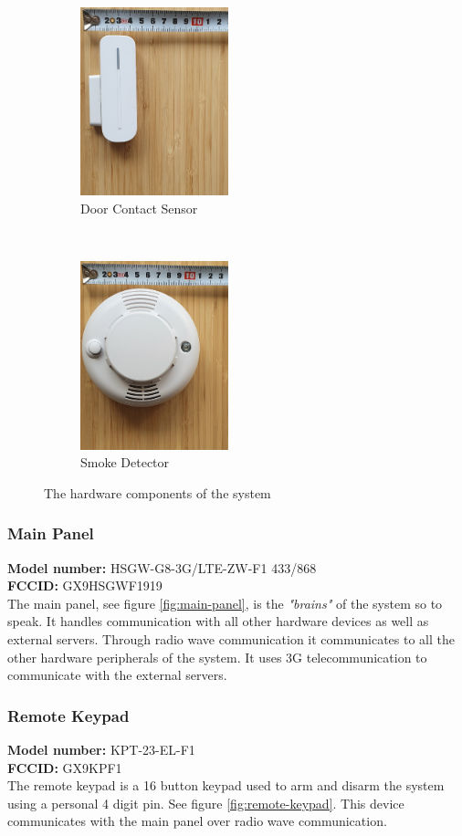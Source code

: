 \begin{figure}[!ht]
    \begin{subfigure}[t]{0.33\textwidth}
        \includegraphics[height=2.15in]{images/3-system/door-contact.png}
        \caption{Door Contact Sensor}
        \label{fig:door-contact}
    \end{subfigure}%
    ~
    \begin{subfigure}[t]{0.33\textwidth}
        \includegraphics[height=2.15in]{images/3-system/smoke-detector.png}
        \caption{Smoke Detector}
        \label{fig:smoke-detector}
    \end{subfigure}
    \caption{The hardware components of the system}
    \label{fig:hardware-components}
\end{figure}
\subsubsection{Main Panel}
\textbf{Model number:} HSGW-G8-3G/LTE-ZW-F1 433/868 \\
\textbf{FCCID:} GX9HSGWF1919 \\
The main panel, see figure \ref{fig:main-panel}, is the \textit{"brains"} of the system so to speak. It handles communication with all other hardware devices as well as external servers. Through radio wave communication it communicates to all the other hardware peripherals of the system. It uses 3G telecommunication to communicate with the external servers.

\subsubsection{Remote Keypad}
\textbf{Model number:} KPT-23-EL-F1 \\ %
\textbf{FCCID:} GX9KPF1 \\ %
The remote keypad is a 16 button keypad used to arm and disarm the system using a personal 4 digit pin. See figure \ref{fig:remote-keypad}. This device communicates with the main panel over radio wave communication.

